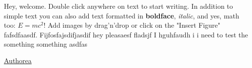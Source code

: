 Hey, welcome. Double click anywhere on  text to start writing. In addition to simple text you can also add text formatted in \textbf{boldface}, \textit{italic}, and yes, math too: $E  =  mc^{2}$! Add images by drag'n'drop or click on the "Insert Figure" fafsdfaasdf. Fijfosfajsdifjasdif hey pleasaesf fladsjf I hguhfaudh i i need to test the something something 
asdfas \def\authorea{\href{http://en.wikipedia.org/wiki/Authorea}{Authorea}\xspace}
\def\latexml{\href{https://en.wikipedia.org/wiki/LaTeXML}{LaTeXML}\xspace}
\def\latex{\href{https://en.wikipedia.org/wiki/LaTeX}{\LaTeX}\xspace}

\authorea